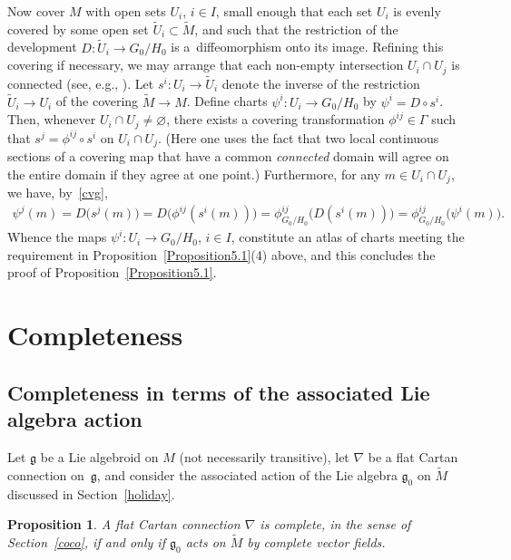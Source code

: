 \documentclass[pdftex]{sigma}
\numberwithin{equation}{section}
\newtheorem{PropositionBlaom}[TheoremBlaom]{Proposition}
 { \theoremstyle{definition}
\newtheorem{CounterexampleBlaom}[TheoremBlaom]{Counterexample}
\newtheorem{RemarkBlaom}[TheoremBlaom]{Remark} }
\begin{document}
Now cover $M$ with open sets $U_i$, $i \in I$, small enough that each
set $U_i$ is evenly covered by some open set $\tilde U_i \subset
\tilde M$, and such that the restriction of the development $D
\colon \tilde U_i \rightarrow {G_0/H_0}$ is a~dif\/feomorphism onto its
image. Ref\/ining this covering if necessary, we may arrange that each
non-empty intersection $U_i \cap U_j $ is connected (see, e.g., \cite[Theorem~I.5.1]{Bott_Tu_82}). Let $s^i \colon U_i \rightarrow \tilde
U_i$ denote the inverse of the restriction $\tilde U_i \rightarrow
U_i$ of the covering $\tilde M \rightarrow M$. Def\/ine charts $\psi^i
\colon U_i \rightarrow {G_0/H_0}$ by $\psi^i=D \circ s^i$. Then, whenever
$U_i \cap U_j\ne \varnothing $, there exists a covering transformation
$\phi^{ij}\in \Gamma $ such that $s^j=\phi^{ij} \circ s^i$ on $U_i\cap
U_j$. (Here one uses the fact that two local continuous sections of a
covering map that have a common {\em connected} domain will agree on
the entire domain if they agree at one point.) Furthermore, for any $
m \in U_i\cap U_j$, we have, by~\eqref{cvg},
\begin{gather*}
  \psi^j(m)=D\big(s^j(m)\big)=D\big(\phi^{ij}(s^i(m))\big)
  =\phi^{ij}_{G_0/H_0}\big(D(s^i(m))\big)=\phi^{ij}_{G_0/H_0}\big(\psi^i(m)\big).
\end{gather*}
Whence the maps $\psi^i \colon U_i \rightarrow {G_0/H_0}$, $i \in I$,
constitute an atlas of charts meeting the requirement in Proposition~\ref{Proposition5.1}(4) %
above, and this concludes the proof of
Proposition~\ref{Proposition5.1}.

\section{Completeness}\label{completenessSection}
\subsection{Completeness in terms of the associated Lie algebra action}\label{recharacterize}

Let $\mathfrak g$ be a Lie algebroid on $M$ (not necessarily
transitive), let $\nabla $ be a f\/lat Cartan connection on~$\mathfrak
g$, and consider the associated action of the Lie algebra ${\mathfrak
  g}_0 $ on $\tilde M$ discussed in Section~\ref{holiday}.
\begin{PropositionBlaom}\label{Proposition6.1}
  A flat Cartan connection $\nabla$ is complete, in the sense of
  Section~{\rm \ref{coco}}, if and only if ${\mathfrak g}_0 $ acts on $\tilde M$
  by complete vector fields.
\end{PropositionBlaom}
\end{document}
